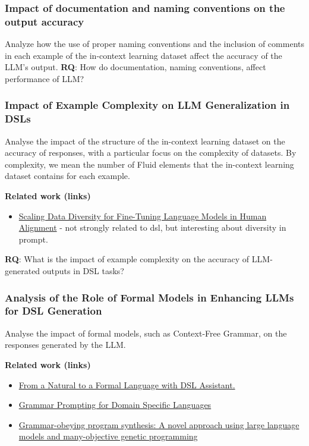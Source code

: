 \subsubsection{Impact of documentation and naming conventions on the output accuracy}
Analyze how the use of proper naming conventions and the inclusion of comments in each example of the
in-context learning dataset affect the accuracy of the LLM's output. \textbf{RQ}: How do documentation, naming
conventions, affect performance of LLM?

\subsubsection{Impact of Example Complexity on LLM Generalization in DSLs}
Analyse the impact of the structure of the in-context learning dataset on the accuracy of responses, with a
particular focus on the complexity of datasets. By complexity, we mean the number of Fluid elements that the
in-context learning dataset contains for each example.

\textbf{Related work (links)}
\begin{itemize}
    \item \href{http://www.lrec-conf.org/proceedings/lrec-coling-2024/pdf/2024.main-1.1251.pdf}{Scaling Data Diversity for Fine-Tuning Language Models in Human Alignment} - not strongly related to dsl, but interesting about diversity in prompt.
\end{itemize}

\textbf{RQ}: What is the impact of example complexity on the accuracy of LLM-generated outputs in DSL tasks?

\subsubsection{Analysis of the Role of Formal Models in Enhancing LLMs for DSL Generation}

Analyse the impact of formal models, such as Context-Free Grammar, on the responses generated by the LLM.

\textbf{Related work (links)}
\begin{itemize}
    \item \href{https://dl.acm.org/doi/10.1145/3652620.3687811}{From a Natural to a Formal Language with DSL Assistant.}
    \item \href{https://proceedings.neurips.cc/paper_files/paper/2023/file/cd40d0d65bfebb894ccc9ea822b47fa8-Paper-Conference.pdf}{Grammar Prompting for Domain Specific Languages}
    \item \href{https://www.sciencedirect.com/science/article/abs/pii/S0920548924001077}{Grammar-obeying program synthesis: A novel approach using large language models and many-objective genetic programming}
\end{itemize}

